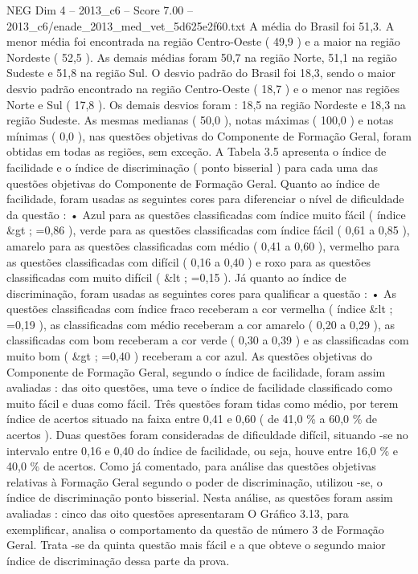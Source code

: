 \begin{textsample}{NEG Dim 4 – 2013\_c6 – Score 7.00 – 2013\_c6/enade\_2013\_med\_vet\_5d625e2f60.txt}
A média do Brasil foi 51,3.
A menor média foi encontrada na região Centro-Oeste ( 49,9 ) e a maior na região Nordeste ( 52,5 ).
As demais médias foram 50,7 na região Norte, 51,1 na região Sudeste e 51,8 na região Sul.
O desvio padrão do Brasil foi 18,3, sendo o maior desvio padrão encontrado na região Centro-Oeste ( 18,7 ) e o menor nas regiões Norte e Sul ( 17,8 ).
Os demais desvios foram : 18,5 na região Nordeste e 18,3 na região Sudeste.
As mesmas medianas ( 50,0 ), notas máximas ( 100,0 ) e notas mínimas ( 0,0 ), nas questões objetivas do Componente de Formação Geral, foram obtidas em todas as regiões, sem exceção.
A Tabela 3.5 apresenta o índice de facilidade e o índice de discriminação ( ponto bisserial ) para cada uma das questões objetivas do Componente de Formação Geral.
Quanto ao índice de facilidade, foram usadas as seguintes cores para diferenciar o nível de dificuldade da questão : • Azul para as questões classificadas com índice muito fácil ( índice \&gt ; =0,86 ), verde para as questões classificadas com índice fácil ( 0,61 a 0,85 ), amarelo para as questões classificadas com médio ( 0,41 a 0,60 ), vermelho para as questões classificadas com difícil ( 0,16 a 0,40 ) e roxo para as questões classificadas com muito difícil ( \&lt ; =0,15 ).
Já quanto ao índice de discriminação, foram usadas as seguintes cores para qualificar a questão : • As questões classificadas com índice fraco receberam a cor vermelha ( índice \&lt ; =0,19 ), as classificadas com médio receberam a cor amarelo ( 0,20 a 0,29 ), as classificadas com bom receberam a cor verde ( 0,30 a 0,39 ) e as classificadas com muito bom ( \&gt ; =0,40 ) receberam a cor azul.
As questões objetivas do Componente de Formação Geral, segundo o índice de facilidade, foram assim avaliadas : das oito questões, uma teve o índice de facilidade classificado como muito fácil e duas como fácil.
Três questões foram tidas como médio, por terem índice de acertos situado na faixa entre 0,41 e 0,60 ( de 41,0 \% a 60,0 \% de acertos ).
Duas questões foram consideradas de dificuldade difícil, situando -se no intervalo entre 0,16 e 0,40 do índice de facilidade, ou seja, houve entre 16,0 \% e 40,0 \% de acertos.
Como já comentado, para análise das questões objetivas relativas à Formação Geral segundo o poder de discriminação, utilizou -se, o índice de discriminação ponto bisserial.
Nesta análise, as questões foram assim avaliadas : cinco das oito questões apresentaram O Gráfico 3.13, para exemplificar, analisa o comportamento da questão de número 3 de Formação Geral.
Trata -se da quinta questão mais fácil e a que obteve o segundo maior índice de discriminação dessa parte da prova.

\end{textsample}
